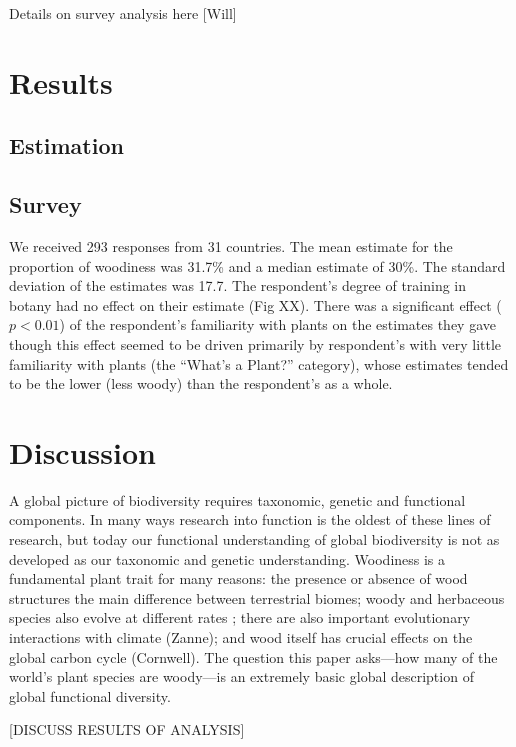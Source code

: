 \documentclass[12pt]{article}
\begin{document}
Details on survey analysis here [Will]


\section{Results}

\subsection{Estimation}

\subsection{Survey}

We received 293 responses from 31 countries. The mean estimate for the proportion of woodiness was 31.7\% and a median estimate of 30\%. The standard deviation of the estimates was 17.7. The respondent's degree of training in botany had no effect on their estimate (Fig XX). There was a significant effect ($p<0.01$) of the respondent's  familiarity with plants on the estimates they gave though this effect seemed to be driven primarily by respondent's with very little familiarity with plants (the ``What's a Plant?'' category), whose estimates tended to be the lower (less woody) than the respondent's as a whole.

\section{Discussion}

A global picture of biodiversity requires taxonomic, genetic and functional components.  In many ways research into function is the oldest of these lines of research, but today our functional understanding of global biodiversity is not as developed as our taxonomic and genetic understanding. Woodiness is a fundamental plant trait for many reasons: the presence or absence of wood  structures the main difference between terrestrial biomes; woody and herbaceous species also evolve at different rates \citep{SmithDonoghue};  there are also important evolutionary interactions with climate (Zanne); and wood itself has crucial effects on the global carbon cycle (Cornwell).  The question this paper asks---how many of the world's plant species are woody---is an extremely basic global description of global functional diversity.

[DISCUSS RESULTS OF ANALYSIS]
\end{document}
